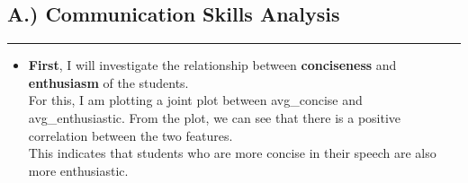 \documentclass{article}
\begin{document}
\subsection{A.) Communication Skills Analysis}
\begin{center}
    \color{green}\rule{1\linewidth}{0.7mm}
\end{center}
\begin{itemize}
    \item \textbf{First}, I will investigate the relationship between \textbf{conciseness} and \textbf{enthusiasm} of the students.\\ 
    For this, I am plotting a joint plot between avg\_concise and avg\_enthusiastic. From the plot, we can see that there is a positive correlation between the two features.\\
    
    This indicates that students who are more concise in their speech are also more enthusiastic.


\end{itemize}
\end{document}
